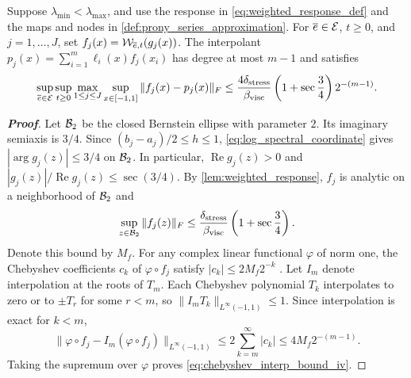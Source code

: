 {\begin{lemma}\label{lem:uniform_prony_discretization_beta}
Suppose $\lambda_{\min}<\lambda_{\max}$, and use the response in \cref{eq:weighted_response_def} and the maps and nodes in \cref{def:prony_series_approximation}. For $\overline e\in{\mathcal{E}}$, $t\ge0$, and $j=1,\dots,J$, set $f_j(x)={\mathcal{W}}_{\overline e,t}(g_j(x))$. The interpolant $p_j(x)=\sum_{i=1}^m\ell_i(x)f_j(x_i)$ has degree at most $m-1$ and satisfies
\begin{equation}\label{eq:chebyshev_interp_bound_iv}
\sup_{\overline e\in{\mathcal{E}}}\sup_{t\ge0}\max_{1\le j\le J}\sup_{x\in[-1,1]}\|f_j(x)-p_j(x)\|_F
\le\frac{4\delta_{\rm stress}}{\beta_{\rm visc}}\left(1+\sec\frac34\right)2^{-(m-1)}.
\end{equation}
\end{lemma}

\begin{proof}[\bf Proof]
Let ${\mathcal{B}}_2$ be the closed Bernstein ellipse with parameter $2$. Its imaginary semiaxis is $3/4$. Since $(b_j-a_j)/2\le h\le1$, \cref{eq:log_spectral_coordinate} gives $|\arg g_j(z)|\le3/4$ on ${\mathcal{B}}_2$. In particular, $\operatorname{Re}g_j(z)>0$ and $|g_j(z)|/\operatorname{Re}g_j(z)\le\sec(3/4)$. By \cref{lem:weighted_response}, $f_j$ is analytic on a neighborhood of ${\mathcal{B}}_2$ and
\begin{equation*}
\sup_{z\in{\mathcal{B}}_2}\|f_j(z)\|_F\le\frac{\delta_{\rm stress}}{\beta_{\rm visc}}\left(1+\sec\frac34\right).
\end{equation*}
Denote this bound by $M_f$. For any complex linear functional $\varphi$ of norm one, the Chebyshev coefficients $c_k$ of $\varphi\circ f_j$ satisfy $|c_k|\le2M_f2^{-k}$ \cite[Theorem 8.1]{trefethen2019approximation}. Let $I_m$ denote interpolation at the roots of $T_m$. Each Chebyshev polynomial $T_k$ interpolates to zero or to $\pm T_r$ for some $r<m$, so $\|I_mT_k\|_{L^\infty(-1,1)}\le1$. Since interpolation is exact for $k<m$,
\begin{equation*}
\|\varphi\circ f_j-I_m(\varphi\circ f_j)\|_{L^\infty(-1,1)}
\le2\sum_{k=m}^{\infty}|c_k|
\le4M_f2^{-(m-1)}.
\end{equation*}
Taking the supremum over $\varphi$ proves \cref{eq:chebyshev_interp_bound_iv}.
\end{proof}

}
